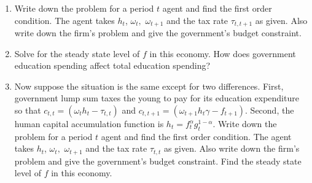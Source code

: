 \documentclass[12pt]{article}
\begin{document}
\begin{enumerate}
\begin{enumerate}
\item Write down the problem for a period $t$ agent and find the first order
condition. The agent takes $h_{t}$, $\omega _{t},$ $\omega _{t+1}$ and the
tax rate $\tau _{t,t+1}$ as given. Also write down the firm's problem and
give the government's budget constraint.

\item Solve for the steady state level of $f$ in this economy. How does
government education spending affect total education spending?

\item Now suppose the situation is the same except for two differences.
First, government lump sum taxes the young to pay for its education
expenditure so that $c_{t,t}=\left( \omega _{t}h_{t}-\tau _{t,t}\right) $
and $c_{t,t+1}=\left( \omega _{t+1}h_{t}\gamma -f_{t+1}\right) $. Second,
the human capital accumulation function is $h_{t}=f_{t}^{\alpha
}g_{t}^{1-\alpha }$. Write down the problem for a period $t$ agent and find
the first order condition. The agent takes $h_{t}$, $\omega _{t},$ $\omega
_{t+1}$ and the tax rate $\tau _{t,t}$ as given. Also write down the firm's
problem and give the government's budget constraint. Find the steady state
level of $f$ in this economy.
\end{enumerate}
\end{enumerate}

\pagebreak
\end{document}
